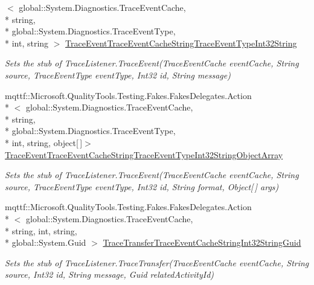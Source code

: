 \begin{DoxyCompactItemize}
$<$ global\-::\-System.\-Diagnostics.\-Trace\-Event\-Cache, \\*
string, \\*
global\-::\-System.\-Diagnostics.\-Trace\-Event\-Type, \\*
int, string $>$ \hyperlink{class_system_1_1_diagnostics_1_1_fakes_1_1_stub_console_trace_listener_a64d9289b80b02e4ed2ef612175b28c04}{Trace\-Event\-Trace\-Event\-Cache\-String\-Trace\-Event\-Type\-Int32\-String}
\begin{DoxyCompactList}\small\item\em Sets the stub of Trace\-Listener.\-Trace\-Event(\-Trace\-Event\-Cache event\-Cache, String source, Trace\-Event\-Type event\-Type, Int32 id, String message)\end{DoxyCompactList}\item 
mqttf\-::\-Microsoft.\-Quality\-Tools.\-Testing.\-Fakes.\-Fakes\-Delegates.\-Action\\*
$<$ global\-::\-System.\-Diagnostics.\-Trace\-Event\-Cache, \\*
string, \\*
global\-::\-System.\-Diagnostics.\-Trace\-Event\-Type, \\*
int, string, object\mbox{[}$\,$\mbox{]}$>$ \hyperlink{class_system_1_1_diagnostics_1_1_fakes_1_1_stub_console_trace_listener_a7e30beb588a049bc13dfaba64b01693e}{Trace\-Event\-Trace\-Event\-Cache\-String\-Trace\-Event\-Type\-Int32\-String\-Object\-Array}
\begin{DoxyCompactList}\small\item\em Sets the stub of Trace\-Listener.\-Trace\-Event(\-Trace\-Event\-Cache event\-Cache, String source, Trace\-Event\-Type event\-Type, Int32 id, String format, Object\mbox{[}$\,$\mbox{]} args)\end{DoxyCompactList}\item 
mqttf\-::\-Microsoft.\-Quality\-Tools.\-Testing.\-Fakes.\-Fakes\-Delegates.\-Action\\*
$<$ global\-::\-System.\-Diagnostics.\-Trace\-Event\-Cache, \\*
string, int, string, \\*
global\-::\-System.\-Guid $>$ \hyperlink{class_system_1_1_diagnostics_1_1_fakes_1_1_stub_console_trace_listener_a8933685742eae97ed6da8206eb9eb3ed}{Trace\-Transfer\-Trace\-Event\-Cache\-String\-Int32\-String\-Guid}
\begin{DoxyCompactList}\small\item\em Sets the stub of Trace\-Listener.\-Trace\-Transfer(\-Trace\-Event\-Cache event\-Cache, String source, Int32 id, String message, Guid related\-Activity\-Id)\end{DoxyCompactList}\item 

\end{DoxyCompactItemize}
